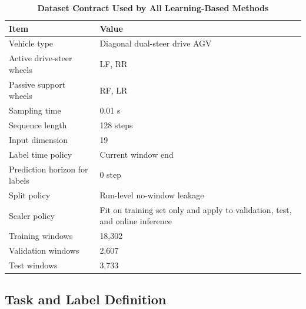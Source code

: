 \documentclass[twocolumn]{article}
\begin{document}
\begin{table}[!t]

\caption{\textbf{Dataset Contract Used by All Learning-Based Methods}}

\label{tab:dataset_contract}

\setlength{\tabcolsep}{3pt}

\begin{tabular}{|p{108pt}|p{130pt}|}

\hline

Item & Value \\

\hline

Vehicle type & Diagonal dual-steer drive AGV \\

Active drive-steer wheels & LF, RR \\

Passive support wheels & RF, LR \\

Sampling time & 0.01 s \\

Sequence length & 128 steps \\

Input dimension & 19 \\

Label time policy & Current window end \\

Prediction horizon for labels & 0 step \\

Split policy & Run-level no-window leakage \\

Scaler policy & Fit on training set only and apply to validation, test, and online inference \\

Training windows & 18,302 \\

Validation windows & 2,607 \\

Test windows & 3,733 \\

\hline

\end{tabular}

\end{table}

\subsection{Task and Label Definition}
\end{document}
